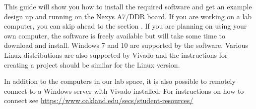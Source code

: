 \documentclass[letterpaper]{article}
\begin{document}
This guide will show you how to install the required software and get an example design up and
running on the Nexys A7/DDR board.
If you are working on a lab computer, you can skip ahead to the section
.
If you are planning on using your own computer, the software is freely available but will take some
time to download and install.
Windows 7 and 10 are supported by the software.
Various Linux distributions are also supported by Vivado and the instructions for creating a
project should be similar for the Linux version.

In addition to the computers in our lab space, it is also possible to remotely connect to a Windows
server with Vivado installed. For instructions on how to connect see
\url{https://www.oakland.edu/secs/student-resources/}




\end{document}
